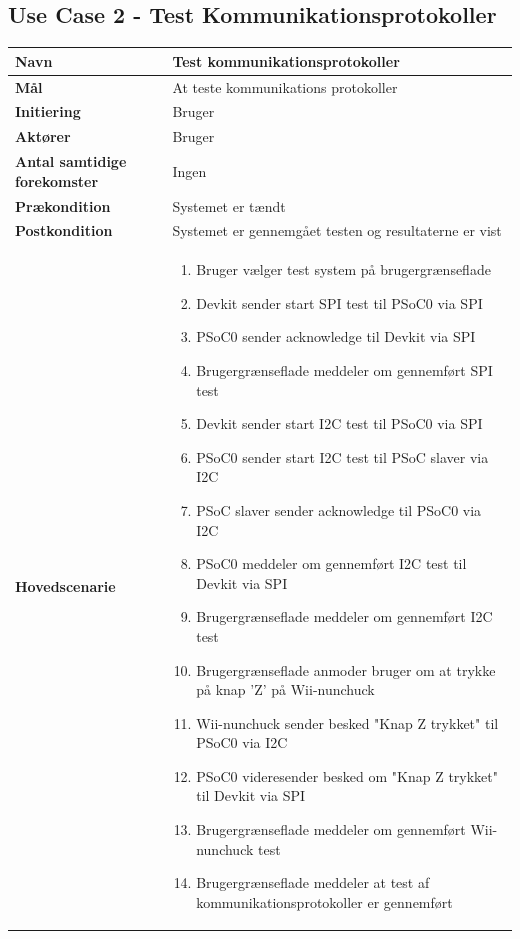 \subsection{Use Case 2 - Test Kommunikationsprotokoller}
\label{afsnit:FUC2}
\begin{longtable}{|>{\hspace{0pt}}p{3cm}  |>{\hspace{0pt}}p{9cm}|}
	\hline
	\textbf{Navn} & Test kommunikationsprotokoller\\ \hline
	\textbf{Mål} & At teste kommunikations protokoller \\ \hline
	\textbf{Initiering} & Bruger\\ \hline
	\textbf{Aktører} & Bruger\\ \hline
	\textbf{Antal samtidige forekomster} & Ingen \\ \hline
	\textbf{Prækondition} & Systemet er tændt \\ \hline
	\textbf{Postkondition} &  Systemet er gennemgået testen og resultaterne er vist \\ \hline
	\textbf{Hovedscenarie} & \begin{enumerate}
		\item Bruger vælger test system på brugergrænseflade
		\item Devkit sender start SPI test til PSoC0 via SPI
		\item PSoC0 sender acknowledge til Devkit via SPI
		\subitem[Exception 1: PSoC0 sender ikke acknowledge]
		\item Brugergrænseflade meddeler om gennemført SPI test
		\item Devkit sender start I2C test til PSoC0 via SPI
		\item PSoC0 sender start I2C test til PSoC slaver via I2C
		\item PSoC slaver sender acknowledge til PSoC0 via I2C
		\subitem[Exception 2: PSoC slaver sender ikke acknowledge]
		\item PSoC0 meddeler om gennemført I2C test til Devkit via SPI
		\item Brugergrænseflade meddeler om gennemført I2C test
		\item Brugergrænseflade anmoder bruger om at trykke på knap 'Z' på Wii-nunchuck
		\item Wii-nunchuck sender besked "Knap Z trykket" til PSoC0 via I2C
		\subitem[Exception 3: Wii-nunchuck sender ikke "Knap Z trykket"]
		\item PSoC0 videresender besked om "Knap Z trykket" til Devkit via SPI
		\item Brugergrænseflade meddeler om gennemført Wii-nunchuck test
		\item Brugergrænseflade meddeler at test af kommunikationsprotokoller er gennemført 
		

\end{enumerate}
\end{longtable}
